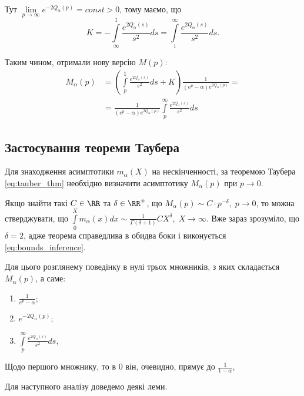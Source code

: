 Тут $\lim\limits_{p\rightarrow \infty} e^{- 2Q_\alpha(p)} = const > 0$, тому маємо, що
\begin{equation}
	K = -  \int\limits_\infty^1 \frac{e^{2Q_\alpha(s)}}{s^2} ds =  \int\limits_1^\infty \frac{e^{2Q_\alpha(s)}}{s^2} ds.
\end{equation}

Таким чином, отримали нову версію $M(p)$:
\begin{equation}
\begin{split}
	\label{eq:uniform_right_laplace_sol}
	M_\alpha(p)&= \left( \int\limits_p^1 \frac{e^{2Q_\alpha(s)}}{s^2} ds + K \right) \frac{1}{(e^p - \alpha)  e^{2Q_\alpha(p)}}
 = \\
	&=\frac{1}{(e^p - \alpha)  e^{2Q_\alpha(p)}} \int\limits_p^\infty \frac{e^{2Q_\alpha(s)}}{s^2} ds
\end{split}
\end{equation}

\subsection{Застосування теореми Таубера}

Для знаходження асимптотики $m_\alpha(X)$ на нескінченності, за теоремою Таубера \eqref{eq:tauber_thm} необхідно визначити асимптотику $M_\alpha(p)$ при $p \rightarrow 0$.

Якщо знайти такі $C \in \RR$ та $\delta \in \RR^+$, що $M_\alpha(p) \sim C \cdot p^{-\delta}, \; p \rightarrow 0$, то можна стверджувати, що $\int\limits_0^X m_\alpha(x) dx \sim \frac{1}{\Gamma(\delta + 1)} C X^\delta, \; X \rightarrow \infty$. Вже зараз зрозуміло, що $\delta = 2$, адже теорема справедлива в обидва боки і виконується \eqref{eq:bounds_inference}.

Для цього розглянему поведінку в нулі трьох множників, з яких складається $M_\alpha(p)$, а саме:
\begin{enumerate}
	\item $\frac{1}{e^p - \alpha}$;
	\item $e^{-2Q_\alpha(p)}$;
	\item $\int\limits_p^\infty \frac{e^{2Q_\alpha(s)}}{s^2} ds$,
\end{enumerate}

Щодо першого множнику, то в 0 він, очевидно, прямує до $\frac{1}{1-\alpha}$,

Для наступного аналізу доведемо деякі леми.

